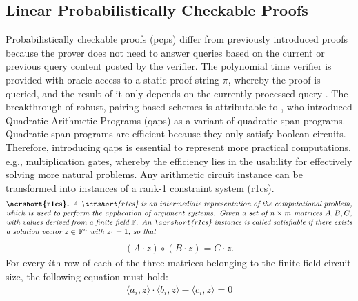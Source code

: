\subsection{Linear Probabilistically Checkable Proofs}
Probabilistically checkable proofs (\acrshort{pcp}s) differ from previously introduced proofs because the prover does not need to answer queries based on the current or previous query content posted by the verifier. The polynomial time verifier is provided with oracle access to a static proof string \begin{math} \pi \end{math}, whereby the proof is queried, and the result of it only depends on the currently processed query \citep{PCP}. The breakthrough of robust, pairing-based schemes is attributable to \citet{GennaroLinPCP}, who introduced Quadratic Arithmetic Programs (\acrshort{qap}s) as a variant of quadratic span programs. Quadratic span programs are efficient because they only satisfy boolean circuits. Therefore, introducing \acrshort{qap}s is essential to represent more practical computations, e.g., multiplication gates, whereby the efficiency lies in the usability for effectively solving more natural problems. Any arithmetic circuit instance can be transformed into instances of a rank-1 constraint system (\acrshort{r1cs}).
\begin{align*}
    \text{\parbox{450pt}{\textbf{\acrshort{r1cs}.} \textit{A \acrshort{r1cs} is an intermediate representation of the computational problem, which is used to perform the application of argument systems. Given a set of \(n \times m \text{ matrices} \ A, B, C\), with values derived from a finite field \begin{math} \mathbb{F} \end{math}. An \acrshort{r1cs} instance is called satisfiable if there exists a solution vector \(z \in\) \begin{math} \mathbb{F}^n \end{math} with \(z_1 = 1\), so that}}}
\end{align*}
\begin{align*}
    (A \cdot z) \circ (B \cdot z) = C \cdot z.
\end{align*}
For every \(i\)th row of each of the three matrices belonging to the finite field circuit size, the following equation must hold:
\begin{align}
    \langle a_i, z \rangle \cdot \langle b_i, z \rangle - \langle c_i, z\rangle = 0 
\end{align}

